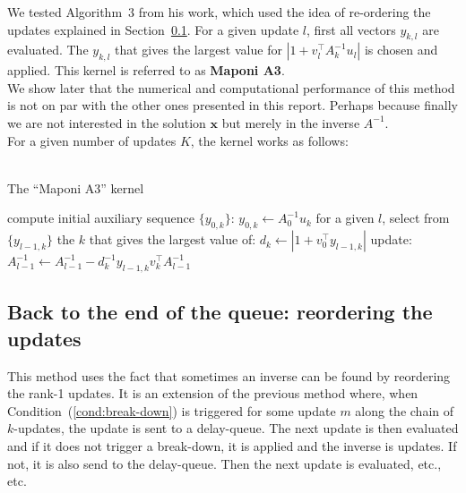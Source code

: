 \documentclass[11pt]{article}
\numberwithin{figure}{section}
\numberwithin{table}{section}
\begin{document}
				We tested Algorithm~3 from his work, which used the idea of re-ordering the updates explained in Section~\ref{sec:reordering}. For a given update $l$, first all vectors $y_{k,l}$ are evaluated. The $y_{k,l}$ that gives the largest value for $\left|1+v_l^\top A_k^{-1}u_l\right|$ is chosen and applied.  This kernel is referred to as \textbf{Maponi A3}.\\
				
				We show later that the numerical and computational performance of this method is not on par with the other ones presented in this report. Perhaps because finally we are not interested in the solution $\mathbf{x}$ but merely in the inverse $A^{-1}$.\\
				
				For a given number of updates $K$, the kernel works as follows:\\
				\\
				\begin{algorithm}[H]
				\caption{The ``Maponi A3'' kernel}\label{algo:ma3}
				 {
					compute initial auxiliary sequence $\{y_{0,k}\}$: $y_{0,k} \gets A^{-1}_{0}u_k$\;
				}
				 {
					for a given $l$, select from $\{y_{l-1,k}\}$
					the $k$ that gives the largest value of:
					$d_k \gets \left|1+v_0^\top y_{l-1,k}\right|$\;
					update: $A^{-1}_{l-1} \gets A^{-1}_{l-1} - d_k^{-1}y_{l-1,k}v_k^\top A^{-1}_{l-1}$\;
				}
				\end{algorithm}
							
			\subsection{Back to the end of the queue: reordering the updates}\label{sec:reordering}
			
				This method uses the fact that sometimes an inverse can be found by reordering the rank-1 updates. It is an extension of the previous method where, when Condition~(\ref{cond:break-down}) is triggered for some update $m$ along the chain of $k$-updates, the update is sent to a delay-queue. The next update is then evaluated and if it does not trigger a break-down, it is applied and the inverse is updates. If not, it is also send to the delay-queue. Then the next update is evaluated, etc., etc.\\
				
\end{document}
